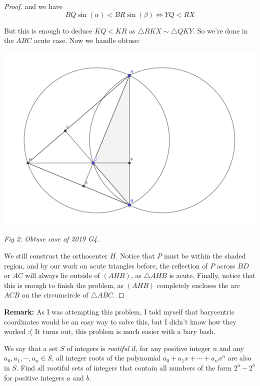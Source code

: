 \documentclass{article}
\theoremstyle{mytheoremstyle}
\theoremstyle{mytheoremstyle}
\theoremstyle{myproblemstyle}
\begin{document}
\begin{proof}
        and we have \[BQ\sin(\alpha) < BR\sin(\beta) \iff YQ < RX\]

        But this is enough to deduce $KQ < KR$ as $\triangle RKX \sim \triangle QKY$. So we're done in the $ABC$ acute case. Now we handle obtuse:

        \begin{center}
            \includegraphics[scale=0.4]{2019_G4_2.png}

            \textit{Fig 2: Obtuse case of 2019 G4.}
        \end{center}


        We still construct the orthocenter $H$. Notice that $P$ must be within the shaded region, and by our work on acute triangles before, the reflection of $P$ across $BD$ or $AC$ will always lie outside of $(AHB)$, as $\triangle AHB$ is acute. Finally, notice that this is enough to finish the problem, as $(AHB)$ completely encloses the arc $ACB$ on the circumcircle of $\triangle ABC$.
    \end{proof}

    \textbf{Remark:} As I was attempting this problem, I told myself that barycentric coordinates would be an easy way to solve this, but I didn't know how they worked :( It turns out, this problem is much easier with a bary bash. 

    \begin{problem}[2019 N3]
        We say that a set $S$ of integers is \textit{rootiful} if, for any positive integer $n$ and any $a_0, a_1, \cdots, a_n \in S$, all integer roots of the polynomial $a_0+a_1x+\cdots+a_nx^n$ are also in $S$. Find all rootiful sets of integers that contain all numbers of the form $2^a - 2^b$ for positive integers $a$ and $b$.
    \end{problem}
\end{document}
